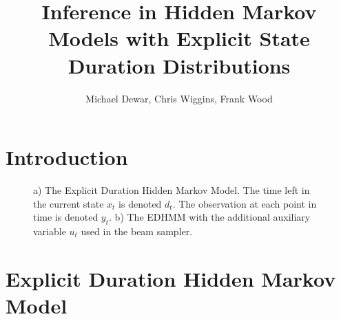 \documentclass[journal]{../inc/oldtran/IEEEtran}
\begin{document}
\title{Inference in Hidden Markov Models with Explicit State Duration Distributions}
\author{Michael Dewar, Chris Wiggins, Frank Wood}%


    
\maketitle

\begin{abstract}

\end{abstract}

\section{Introduction}



    \begin{figure}[t]
        \centering
        \caption{a) The Explicit Duration Hidden Markov Model. The time left in the current state $x_t$ is denoted $d_t$. The observation at each point in time is denoted $y_t$. b) The EDHMM with the additional auxiliary variable $u_t$ used in the beam sampler.}
    \label{fig:graphs}    
    \end{figure}
\section{Explicit Duration Hidden Markov Model}
\label{sec:Model}
\end{document}
